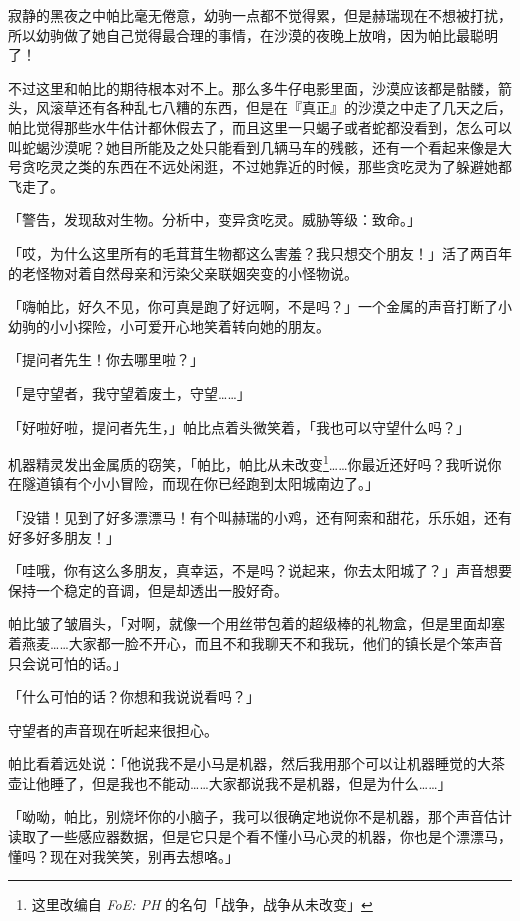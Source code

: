 
寂静的黑夜之中帕比毫无倦意，幼驹一点都不觉得累，但是赫瑞现在不想被打扰，所以幼驹做了她自己觉得最合理的事情，在沙漠的夜晚上放哨，因为帕比最聪明了！

不过这里和帕比的期待根本对不上。那么多牛仔电影里面，沙漠应该都是骷髅，箭头，风滚草还有各种乱七八糟的东西，但是在『真正』的沙漠之中走了几天之后，帕比觉得那些水牛估计都休假去了，而且这里一只蝎子或者蛇都没看到，怎么可以叫蛇蝎沙漠呢？她目所能及之处只能看到几辆马车的残骸，还有一个看起来像是大号贪吃灵之类的东西在不远处闲逛，不过她靠近的时候，那些贪吃灵为了躲避她都飞走了。

「{\mt 警告，发现敌对生物。分析中，变异贪吃灵。威胁等级：致命。}」

「哎，为什么这里所有的毛茸茸生物都这么害羞？我只想交个朋友！」活了两百年的老怪物对着自然母亲和污染父亲联姻突变的小怪物说。

「嗨帕比，好久不见，你可真是跑了好远啊，不是吗？」一个金属的声音打断了小幼驹的小小探险，小可爱开心地笑着转向她的朋友。

「提问者先生！你去哪里啦？」

「是守望者，我守望着废土，守望……」

「好啦好啦，提问者先生，」帕比点着头微笑着，「我也可以守望什么吗？」

机器精灵发出金属质的窃笑，「帕比，帕比从未改变\footnote{这里改编自 \emph{FoE: PH} 的名句「战争，战争从未改变」}……你最近还好吗？我听说你在隧道镇有个小小冒险，而现在你已经跑到太阳城南边了。」

「没错！见到了好多漂漂马！有个叫赫瑞的小鸡，还有阿索和甜花，乐乐姐，还有好多好多朋友！」

「哇哦，你有这么多朋友，真幸运，不是吗？说起来，你去太阳城了？」声音想要保持一个稳定的音调，但是却透出一股好奇。

帕比皱了皱眉头，「对啊，就像一个用丝带包着的超级棒的礼物盒，但是里面却塞着燕麦……大家都一脸不开心，而且不和我聊天不和我玩，他们的镇长是个笨声音只会说可怕的话。」

「什么可怕的话？你想和我说说看吗？」

守望者的声音现在听起来很担心。

帕比看着远处说：「他说我不是小马是机器，然后我用那个可以让机器睡觉的大茶壶让他睡了，但是我也不能动……大家都说我不是机器，但是为什么……」

「呦呦，帕比，别烧坏你的小脑子，我可以很确定地说你不是机器，那个声音估计读取了一些感应器数据，但是它只是个看不懂小马心灵的机器，你也是个漂漂马，懂吗？现在对我笑笑，别再去想咯。」

